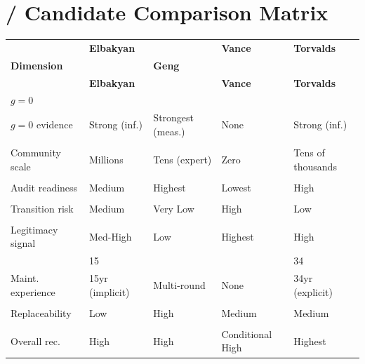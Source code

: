 \documentclass[12pt,a4paper]{article}
\theoremstyle{remark}
\begin{document}
\newpage

\appendix
\section{ / Candidate Comparison Matrix}

\begin{center}
\small
\begin{longtable}{p{} p{} p{} p{} p{}}
\toprule
\textbf{} & \textbf{Elbakyan} & \textbf{} & \textbf{Vance} & \textbf{Torvalds} \\
\textbf{Dimension} & & \textbf{Geng} & & \\
\midrule
\endfirsthead
\toprule
\textbf{} & \textbf{Elbakyan} & \textbf{} & \textbf{Vance} & \textbf{Torvalds} \\
\midrule
\endhead
\bottomrule
\endfoot
\midrule
$g=0$ &  &  &  &  \\
$g=0$ evidence & Strong (inf.) & Strongest (meas.) & None & Strong (inf.) \\
\midrule
 &  &  &  &  \\
Community scale & Millions & Tens (expert) & Zero & Tens of thousands \\
\midrule
 &  &  &  &  \\
Audit readiness & Medium & Highest & Lowest & High \\
\midrule
 &  &  &  &  \\
Transition risk & Medium & Very Low & High & Low \\
\midrule
 &  &  &  &  \\
Legitimacy signal & Med-High & Low & Highest & High \\
\midrule
 & 15 &  &  & 34 \\
Maint. experience & 15yr (implicit) & Multi-round & None & 34yr (explicit) \\
\midrule
 &  &  &  &  \\
Replaceability & Low & High & Medium & Medium \\
\midrule
 &  &  &  &  \\
Overall rec. & High & High & Conditional High & Highest \\
\bottomrule
\end{longtable}
\end{center}
\end{document}
